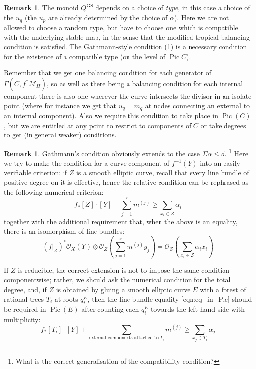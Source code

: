 \documentclass[11pt]{amsart}
\newcommand{\basenote}[1]{\footnote{\color{red}#1}}
\newcommand{\OO}{\mathcal{O}}
\newcommand{\Pic}{\operatorname{Pic}}
\newcommand{\Mcal}{\mathcal{M}}
\theoremstyle{definition}
\theoremstyle{definition}
\newtheorem{remark}[thm]{Remark}
\begin{document}
\begin{remark} The monoid $Q^{\operatorname{GS}}$ depends on a choice of \emph{type}, in this case a choice of the $u_q$ (the $u_p$ are already determined by the choice of $\alpha$). Here we are not allowed to choose a random type, but have to choose one which is compatible with the underlying stable map, in the sense that the modified tropical balancing condition is satisfied. The Gathmann-style condition (1) is a necessary condition for the existence of a compatible type (on the level of $\Pic C$).

Remember that we get one balancing condition for each generator of $\Gamma(C, f^* \overline{\Mcal}_H)$, so as well as there being a balancing condition for each internal component there is also one wherever the curve intersects the divisor in an isolate point (where for instance we get that $u_q = m_q$ at nodes connecting an external to an internal component). Also we require this condition to take place in $\Pic(C)$, but we are entitled at any point to restrict to components of $C$ or take degrees to get (in general weaker) conditions. \end{remark}

\begin{remark} Gathmann's condition obviously extends to the case $\Sigma \alpha \leq d$. \basenote{What is the correct generalisation of the compatibility condition?} Here we try to make the condition for a curve component of $f^{-1}(Y)$ into an easily verifiable criterion: if $Z$ is a smooth elliptic curve, recall that every line bundle of positive degree on it is effective, hence the relative condition can be rephrased as the following numerical criterion:
\begin{equation*} f_*[Z]\cdot [Y]+\sum_{j=1}^r m^{(j)}\geq \sum_{x_i\in Z}\alpha_i \end{equation*}
together with the additional requirement that, when the above is an equality, there is an isomorphism of line bundles:
\begin{equation}\label{eqn:eq_in_Pic}
(f|_{Z})^*\OO_X(Y) \otimes \OO_Z\left(\sum_{j=1}^r m^{(j)}y_j\right)=\OO_Z\left(\sum_{x_i\in Z}\alpha_ix_i\right) 
\end{equation}
 
If $Z$ is reducible, the correct extension is not to impose the same condition componentwise; rather, we should ask the numerical condition for the total degree, and, if $Z$ is obtained by gluing a smooth elliptic curve $E$ with a forest of rational trees $T_i$ at roots $q^E_i$, then the line bundle equality \eqref{eqn:eq_in_Pic} should be required in $\Pic(E)$ after counting each $q^E_i$ towards the left hand side with multiplicity:
\[f_*[T_i]\cdot [Y]+\sum_{\text{external components attached to $T_i$}} m^{(j)} \geq \sum_{x_j\in T_i}\alpha_j\]
\end{remark}
\end{document}

